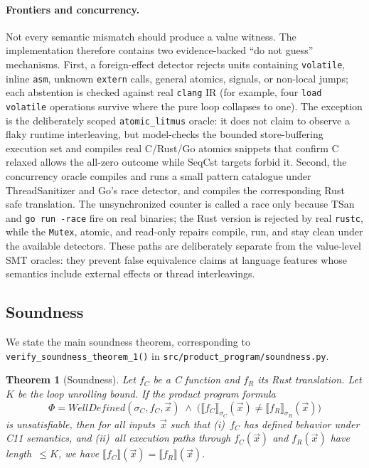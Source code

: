 \documentclass[10pt,a4paper]{article}
\newtheorem{theorem}{Theorem}
\begin{document}
\paragraph{Frontiers and concurrency.}
Not every semantic mismatch should produce a value witness. The implementation
therefore contains two evidence-backed ``do not guess'' mechanisms. First, a
foreign-effect detector rejects units containing \texttt{volatile}, inline
\texttt{asm}, unknown \texttt{extern} calls, general atomics, signals, or non-local jumps;
each abstention is checked against real \texttt{clang} IR (for example, four
\texttt{load volatile} operations survive where the pure loop collapses to one).
The exception is the deliberately scoped \texttt{atomic\_litmus} oracle: it does
not claim to observe a flaky runtime interleaving, but model-checks the bounded
store-buffering execution set and compiles real C/Rust/Go atomics snippets that
confirm C relaxed allows the all-zero outcome while SeqCst targets forbid it.
Second, the concurrency oracle compiles and runs a small pattern catalogue under
ThreadSanitizer and Go's race detector, and compiles the corresponding Rust safe
translation. The unsynchronized counter is called a race only because TSan and
\texttt{go run -race} fire on real binaries; the Rust version is rejected by real
\texttt{rustc}, while the \texttt{Mutex}, atomic, and read-only repairs compile,
run, and stay clean under the available detectors. These paths are deliberately
separate from the value-level SMT oracles: they prevent false equivalence claims
at language features whose semantics include external effects or thread
interleavings.

\subsection{Soundness}\label{sec:soundness}

We state the main soundness theorem, corresponding to
\texttt{verify\_soundness\_theorem\_1()} in
\texttt{src/product\_program/soundness.py}.

\begin{theorem}[Soundness]\label{thm:soundness}
Let $f_C$ be a C function and $f_R$ its Rust translation.  Let
$K$ be the loop unrolling bound.  If the product program formula
\[
\Phi = \mathit{WellDefined}(\sigma_C, f_C, \vec{x}) \;\wedge\;
\bigl(\llbracket f_C \rrbracket_{\sigma_C}(\vec{x}) \neq
\llbracket f_R \rrbracket_{\sigma_R}(\vec{x})\bigr)
\]
is unsatisfiable, then for all inputs~$\vec{x}$ such that (i)~$f_C$
has defined behavior under C11 semantics, and (ii)~all execution paths
through $f_C(\vec{x})$ and $f_R(\vec{x})$ have length~$\leq K$, we
have
$\llbracket f_C \rrbracket(\vec{x}) =
\llbracket f_R \rrbracket(\vec{x})$.
\end{theorem}
\end{document}
